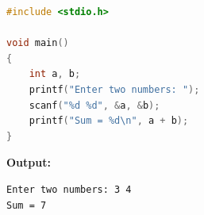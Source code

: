 
\begin{lstlisting}[language=C]
#include <stdio.h>

void main()
{
    int a, b;
    printf("Enter two numbers: ");
    scanf("%d %d", &a, &b);
    printf("Sum = %d\n", a + b);
}
\end{lstlisting}

\textbf{Output:}
\begin{lstlisting}[style=srcoutput]
Enter two numbers: 3 4
Sum = 7
\end{lstlisting}

